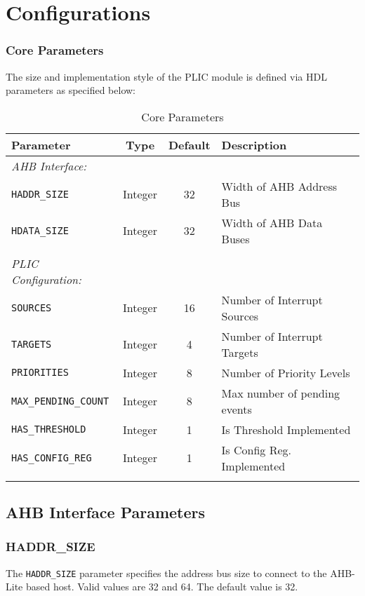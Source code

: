 \chapter{Configurations}

\subsection{Core Parameters}

The size and implementation style of the PLIC module is defined via HDL parameters as specified below:

\begin{longtable}[c]{@{\extracolsep{\fill}}lccl@{}}	
	\toprule 
	\textbf{Parameter}           & \textbf{Type} & \textbf{Default} & \textbf{Description}\\
	\midrule
	\endhead
	\emph{AHB Interface:}\\
	\texttt{HADDR\_SIZE}         & Integer & 32 & Width of AHB Address Bus\\
	\texttt{HDATA\_SIZE}         & Integer & 32 & Width of AHB Data Buses\\
	& & & \\
	\emph{PLIC Configuration:}\\
	\texttt{SOURCES}             & Integer & 16 & Number of Interrupt Sources\\
	\texttt{TARGETS}             & Integer & 4 & Number of Interrupt Targets\\
	\texttt{PRIORITIES}          & Integer & 8 & Number of Priority Levels\\
	\texttt{MAX\_PENDING\_COUNT} & Integer & 8 & Max number of pending events\\
	\texttt{HAS\_THRESHOLD}      & Integer & 1 & Is Threshold Implemented\\
	\texttt{HAS\_CONFIG\_REG}    & Integer & 1 & Is Config Reg. Implemented\\
	\bottomrule 	
	\caption{Core Parameters}
	\label{tab:CoreParams}
\end{longtable}

\section{AHB Interface Parameters}

\subsection{HADDR\_SIZE}

The \texttt{HADDR\_SIZE} parameter specifies the address bus size to connect to the AHB-Lite based host. Valid values are 32 and 64. The default value is 32.

